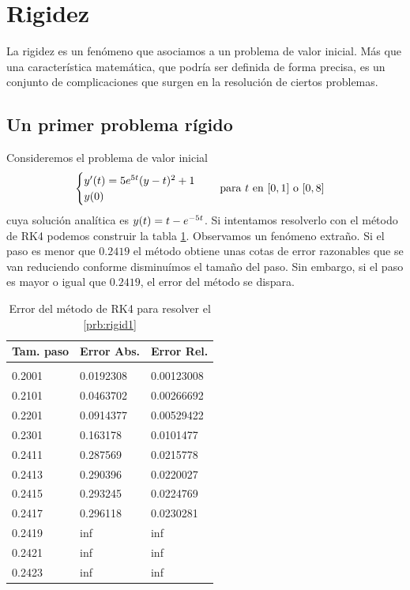 \section{Rigidez}

La rigidez es un fenómeno que asociamos a un problema de valor inicial.
Más que una característica matemática,
que podría ser definida de forma precisa,
es un conjunto de complicaciones que surgen
en la resolución de ciertos problemas.

\subsection{Un primer problema rígido}

Consideremos el problema de valor inicial
%
\begin{equation}\label{prb:rigid1}
    \begin{cases}
        y'(t) = 5\nume^{5t}(y-t)^2 + 1 \\
        y(0)
    \end{cases}
    \qq{para $t$ en $[0,1]$ o $[0,8]$}
\end{equation}
%
cuya solución analítica es $y(t) = t - e^{-5t}$.
Si intentamos resolverlo con el método de RK4
podemos construir la tabla \cref{tab:rigid-problem-rk4-step-error-comparison}.
Observamos un fenómeno extraño.
Si el paso es menor que $0.2419$
el método obtiene unas cotas de error razonables
que se van reduciendo conforme disminuímos el tamaño del paso.
Sin embargo, si el paso es mayor o igual que $0.2419$,
el error del método se dispara.

\begin{table}[h]
    \centering
    \begin{tabular}{lll}
        \textbf{Tam. paso} & \textbf{Error Abs.} & \textbf{Error Rel.} \\
        \hline \\
        0.2001 & 0.0192308 & 0.00123008 \\
        0.2101 & 0.0463702 & 0.00266692 \\
        0.2201 & 0.0914377 & 0.00529422 \\
        0.2301 & 0.163178  & 0.0101477 \\
        0.2411 & 0.287569  & 0.0215778 \\
        0.2413 & 0.290396  & 0.0220027 \\
        0.2415 & 0.293245  & 0.0224769 \\
        0.2417 & 0.296118  & 0.0230281 \\
        0.2419 & inf       & inf \\
        0.2421 & inf       & inf \\
        0.2423 & inf       & inf
    \end{tabular}
    \caption{Error del método de RK4 para resolver el \cref{prb:rigid1}}
    \label{tab:rigid-problem-rk4-step-error-comparison}
\end{table}

